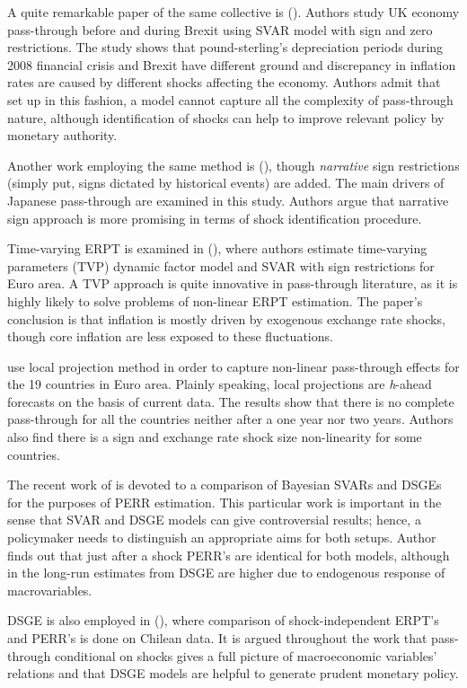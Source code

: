 \documentclass[12pt, a4paper]{extarticle}
\begin{document}
A quite remarkable paper of the same collective is (\cite{Forbes2018}). Authors study UK economy pass-through before and during Brexit using SVAR model with sign and zero restrictions. The study shows that pound-sterling's depreciation periods during 2008 financial crisis and Brexit have different ground and discrepancy in inflation rates are caused by different shocks affecting the economy. Authors admit that set up in this fashion, a model cannot capture all the complexity of pass-through nature, although identification of shocks can help to improve relevant policy by monetary authority.

Another work employing the same method is (\cite{An2020}), though \textit{narrative} sign restrictions (simply put, signs dictated by historical events) are added. The main drivers of Japanese pass-through are examined in this study. Authors argue that narrative sign approach is more promising in terms of shock identification procedure.

Time-varying ERPT is examined in (\cite{LeivaLeon2019}), where authors estimate time-varying parameters (TVP) dynamic factor model and SVAR with sign restrictions for Euro area. A TVP approach is quite innovative in pass-through literature, as it is highly likely to solve problems of non-linear ERPT estimation. The paper's conclusion is that inflation is mostly driven by exogenous exchange rate shocks, though core inflation are less exposed to these fluctuations.

\textcite{Colavecchio2019} use local projection method in order to capture non-linear pass-through effects for the 19 countries in Euro area. Plainly speaking, local projections are \textit{h}-ahead forecasts on the basis of current data. The results show that there is no complete pass-through for all the countries neither after a one year nor two years. Authors also find there is a sign and exchange rate shock size non-linearity for some countries.

The recent work of \textcite{Comunale2020} is devoted to a comparison of Bayesian SVARs and DSGEs for the purposes of PERR estimation. This particular work is important in the sense that SVAR and DSGE models can give controversial results; hence, a policymaker needs to distinguish an appropriate aims for both setups. Author finds out that just after a shock PERR's are identical for both models, although in the long-run estimates from DSGE are higher due to endogenous response of macrovariables. 

DSGE is also employed in (\cite{GarciaCicco2020}), where comparison of shock-independent ERPT's and PERR's is done on Chilean data. It is argued throughout the work that pass-through conditional on shocks gives a full picture of macroeconomic variables' relations and that DSGE models are helpful to generate prudent monetary policy. 
\end{document}
